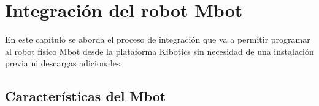 \documentclass{report}
\begin{document}

\chapter{Integración del robot Mbot}

En este capítulo se aborda el proceso de integración que va a permitir programar al robot físico Mbot desde la plataforma Kibotics sin necesidad de una instalación previa ni descargas adicionales.

\section{Características del Mbot}
\end{document}
